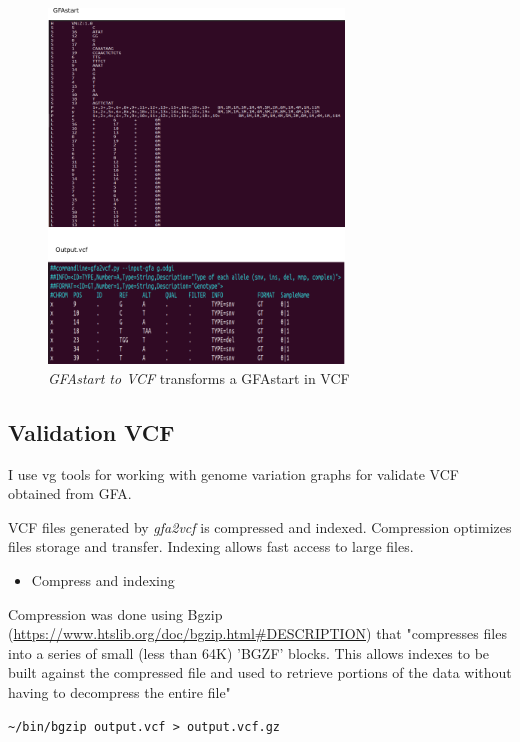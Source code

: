 \begin{figure}[H]
\centering
\includegraphics[width=0.70\textwidth]{fig/gfa2vcf.png}
\decoRule
\caption{\textit{GFAstart to VCF} transforms a GFAstart in VCF}
\label{fig:validation.png}
\end{figure}
\subsection{Validation VCF}



I use vg tools for working with genome variation graphs for validate VCF obtained from GFA. 

VCF files generated by \textit{gfa2vcf} is compressed and indexed. Compression optimizes files storage and transfer. Indexing allows fast access to large files. 
\begin{itemize}
\item Compress and indexing
\end{itemize}

Compression was done using Bgzip (\url{https://www.htslib.org/doc/bgzip.html#DESCRIPTION}) that "compresses files into a series of small (less than 64K) 'BGZF' blocks. This allows indexes to be built against the compressed file and used to retrieve portions of the data without having to decompress the entire file"

\begin{verbatim}
~/bin/bgzip output.vcf > output.vcf.gz
\end{verbatim}


